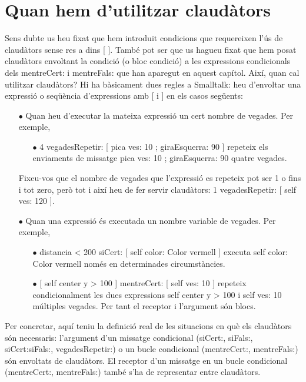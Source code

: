 \section{Quan hem d'utilitzar claudàtors}
Sens dubte us heu fixat que hem introduït condicions que requereixen l'ús de claudàtors sense res a dins [ ]. També pot ser que us hagueu fixat que hem posat claudàtors envoltant la condició (o bloc condició) a les expressions condicionals dels \textsf{mentreCert:} i \textsf{mentreFals:} que han aparegut en aquest capítol. Així, quan cal utilitzar claudàtors? Hi ha bàsicament dues regles a Smalltalk: heu d'envoltar una expressió o seqüència d'expressions amb [ i ] en els casos següents:
\begin{itemize}
\item[$\bullet$] Quan heu d'executar la mateixa expressió un cert nombre de vegades. Per exemple,
\begin{itemize}
\item[$\bullet$] \textsf{4 vegadesRepetir: [ pica ves: 10 ; giraEsquerra: 90 ]} repeteix els enviaments de missatge \textsf{pica ves: 10 ; giraEsquerra: 90} quatre vegades.
\end{itemize}
Fixeu-vos que el nombre de vegades que l'expressió es repeteix pot ser 1 o fins i tot zero, però tot i així heu de fer servir claudàtors: \textsf{1 vegadesRepetir: [ self ves: 120 ]}.
\item[$\bullet$] Quan una expressió és executada un nombre variable de vegades. Per exemple, 
\begin{itemize}
\item[$\bullet$] \textsf{distancia \textless \hspace*{1mm} 200 siCert: [  self color: Color vermell  ]} executa \textsf{self color: Color vermell} només en determinades circumstàncies.
\item[$\bullet$] \textsf{[ self center y \textgreater \hspace*{1mm} 100 ] mentreCert: [ self ves: 10 ]} repeteix condicionalment les dues expressions \textsf{self center y \textgreater \hspace*{1mm} 100} i \textsf{self ves: 10} múltiples vegades. Per tant el receptor i l'argument són blocs.  
\end{itemize}
\end{itemize}

Per concretar, aquí teniu la definició real de les situacions en què els claudàtors són necessaris: l'argument d'un missatge condicional (\textsf{siCert:}, \textsf{siFals:}, \textsf{siCert:siFals:}, \textsf{vegadesRepetir:}) o un bucle condicional (\textsf{mentreCert:}, \textsf{mentreFals:}) són envoltats de claudàtors. El receptor d'un missatge en un bucle condicional (\textsf{mentreCert:}, \textsf{mentreFals:}) també s'ha de representar entre claudàtors.

